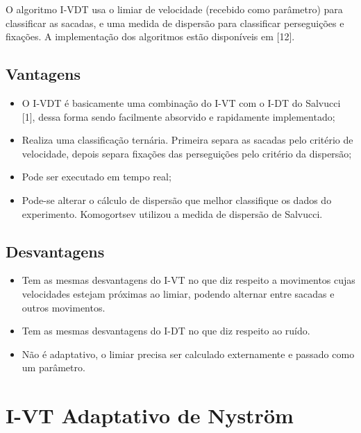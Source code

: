 \documentclass[brazil,]{report}
\begin{document}
O algoritmo \gls{I-VDT} usa o limiar de velocidade (recebido como
parâmetro) para classificar as sacadas, e uma medida de dispersão para
classificar perseguições e fixações. A implementação dos algoritmos
estão disponíveis em {[}12{]}.

\subsection{Vantagens}\label{vantagens-5}

\begin{itemize}
\itemsep1pt\parskip0pt
\item
  O \gls{I-VDT} é basicamente uma combinação do \gls{I-VT} com o
  \gls{I-DT} do Salvucci {[}1{]}, dessa forma sendo facilmente absorvido
  e rapidamente implementado;
\item
  Realiza uma classificação ternária. Primeira separa as sacadas pelo
  critério de velocidade, depois separa fixações das perseguições pelo
  critério da dispersão;
\item
  Pode ser executado em tempo real;
\item
  Pode-se alterar o cálculo de dispersão que melhor classifique os dados
  do experimento. Komogortsev utilizou a medida de dispersão de
  Salvucci.
\end{itemize}

\subsection{Desvantagens}\label{desvantagens-5}

\begin{itemize}
\itemsep1pt\parskip0pt
\item
  Tem as mesmas desvantagens do \gls{I-VT} no que diz respeito a
  movimentos cujas velocidades estejam próximas ao limiar, podendo
  alternar entre sacadas e outros movimentos.
\item
  Tem as mesmas desvantagens do \gls{I-DT} no que diz respeito ao ruído.
\item
  Não é adaptativo, o limiar precisa ser calculado externamente e
  passado como um parâmetro.
\end{itemize}

\section{\gls{I-VT} Adaptativo de
Nyström}\label{adaptativo-de-nystruxf6m}
\end{document}
